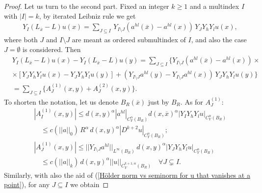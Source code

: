 \documentclass{article}
\numberwithin{equation}{section}
\begin{document}
\begin{proof}
    Let us turn to the second part.
    Fixed an integer $k \geq 1$ and a multindex $I$ with $|I|=k$, by iterated Leibniz rule we get
    \begin{align*}
        &Y_I(L_{\overline{x}}-L)u(x) = \sum_{J \subseteq I} \, Y_{I \setminus J} \left(a^{hl}(\overline{x}) - a^{hl}(x)\right) \, Y_J Y_h Y_l u(x),
    \end{align*}
    where both $J$ and $I \setminus J$ are meant as ordered submultindex of $I$, and also the case $J = \emptyset$ is considered. Then
    \begin{align}
        & Y_I(L_{\overline{x}}-L)u(x) - Y_I(L_{\overline{x}}-L)u(y) = \sum_{J \subseteq I} \{ Y_{I \setminus J} (a^{hl}(\overline{x})-a^{hl}(x)) \times \nonumber \\
        & \times \left[Y_J Y_h Y_l u(x) - Y_J Y_h Y_l u(y) \right] + (Y_{I \setminus J} a^{hl}(y)-Y_{I \setminus J} a^{hl}(x)) \, Y_J Y_h Y_l u(y) \}\nonumber\\
        & \label{rep formula Y_I (L_x-L)} = \sum_{J \subseteq I} \{ A_J^{(1)}(x,y)+A_J^{(2)}(x,y)\}.
    \end{align}
    To shorten the notation, let us denote $B_R(\overline{x})$ just by $B_R$. As for $A_J^{(1)}$:
    \begin{align*}
        & |A_{I}^{(1)}(x,y)| \leq d(x,y)^{\alpha} |a^{hl}|_{C^{\alpha}_Y(B_R)} d(x,\overline{x})^{\alpha} |Y_I Y_h Y_l u|_{C^{\alpha}_Y(B_R)} \\
        & \quad \leq c(||a||_0) \, R^{\alpha} \, d(x,y)^{\alpha} |D^{k+2} u|_{C^{\alpha}_Y(B_R)};\\
        & |A_J^{(1)}(x,y)| \leq ||Y_{I \setminus J} a^{hl}||_{L^{\infty}(B_R)} \, d(x,y)^{\alpha} |Y_J Y_h Y_l u|_{C^{\alpha}_Y(B_R)} \\
        & \quad \leq c(||a||_k) \, d(x,y)^{\alpha} ||u||_{C^{k+1,\alpha}_Y(B_R)} \quad \forall J \subsetneq I.
    \end{align*}
    Similarly, with also the aid of (\ref{Hölder norm vs seminorm for u that vanishes at a point}), for any $J \subseteq I$ we obtain

\end{proof}
\end{document}
